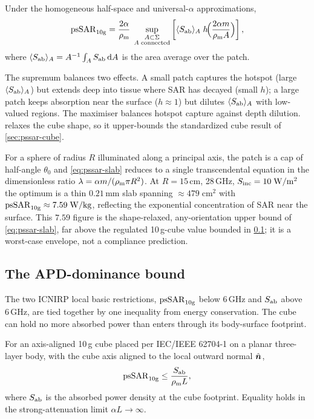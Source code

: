 \begin{theorem}\label{thm:pssar-slab}
Under the homogeneous half-space and universal-$\alpha$ approximations,
\begin{equation}\label{eq:pssar-slab}
  \mathrm{psSAR}_{10\mathrm{g}} = \frac{2\alpha}{\rho_{\mathrm{m}}}\;
    \sup_{\substack{A\subset\Sigma \\ A\;\mathrm{connected}}}
    \left[\langle S_{\mathrm{ab}}\rangle_A\;h\!\Bigl(\frac{2\alpha m}{\rho_{\mathrm{m}} A}\Bigr)\right],
\end{equation}
where $\langle S_{\mathrm{ab}}\rangle_A = A^{-1}\int_A S_{\mathrm{ab}}\,\mathrm{d} A$ is the area average over
the patch.
\end{theorem}

The supremum balances two effects. A small patch captures the hotspot (large
$\langle S_{\mathrm{ab}}\rangle_A$) but extends deep into tissue where SAR has decayed
(small $h$); a large patch keeps absorption near the surface ($h\approx 1$) but
dilutes $\langle S_{\mathrm{ab}}\rangle_A$ with low-valued regions. The maximiser balances
hotspot capture against depth dilution.  relaxes the cube
shape, so it upper-bounds the standardized cube result of
\cref{sec:pssar-cube}.

For a sphere of radius $R$ illuminated along a principal axis, the patch is a
cap of half-angle $\theta_0$ and \cref{eq:pssar-slab} reduces to a single
transcendental equation in the dimensionless ratio
$\lambda = \alpha m/(\rho_{\mathrm{m}}\pi R^2)$. At $R = 15$\,cm, 28\,GHz,
$S_{\mathrm{inc}} = 10\;\mathrm{W/m^2}$ the optimum is a thin $0.21$\,mm slab spanning
$\approx 479\;\mathrm{cm}^2$ with $\mathrm{psSAR}_{10\mathrm{g}} \approx 7.59\;\mathrm{W/kg}$,
reflecting the exponential concentration of SAR near the surface. This $7.59$
figure is the shape-relaxed, any-orientation upper bound of
\cref{eq:pssar-slab}, far above the regulated 10\,g-cube value bounded in
\cref{sec:pssar-dominance}; it is a worst-case envelope, not a compliance
prediction.

\subsection{The APD-dominance bound}
\label{sec:pssar-dominance}

The two ICNIRP local basic restrictions, $\mathrm{psSAR}_{10\mathrm{g}}$ below 6\,GHz and $S_{\mathrm{ab}}$ above
6\,GHz, are tied together by one inequality from energy conservation. The cube
can hold no more absorbed power than enters through its body-surface footprint.

\begin{proposition}\label{prop:apd-dom}
For an axis-aligned 10\,g cube placed per IEC/IEEE 62704-1 on a planar
three-layer body, with the cube axis aligned to the local outward normal
$\hat{\bm{n}}$,
\begin{equation}\label{eq:apd-dom}
  \mathrm{psSAR}_{10\mathrm{g}} \le \frac{S_{\mathrm{ab}}}{\rho_{\mathrm{m}} L},
\end{equation}
where $S_{\mathrm{ab}}$ is the absorbed power density at the cube footprint. Equality holds
in the strong-attenuation limit $\alpha L\to\infty$.
\end{proposition}

